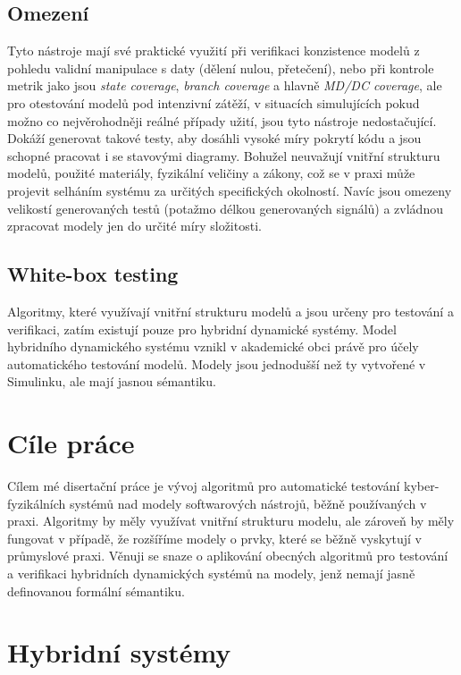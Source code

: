 \documentclass[conference,a4paper]{IEEEtran-CZ}
\begin{document}
\subsection{Omezení}

Tyto nástroje mají své praktické využití při verifikaci
konzistence modelů z pohledu validní manipulace s daty (dělení nulou, přetečení), nebo
při kontrole metrik jako jsou \emph{state coverage}, \emph{branch coverage} a 
hlavně \emph{MD/DC coverage}, ale pro otestování modelů pod intenzivní zátěží, v situacích 
simulujících pokud možno co nejvěrohodněji reálné případy užití, jsou tyto nástroje 
nedostačující. Dokáží generovat takové testy, aby dosáhli vysoké míry pokrytí kódu a
jsou schopné pracovat i se stavovými diagramy. Bohužel neuvažují vnitřní strukturu 
modelů, použité materiály, fyzikální veličiny a zákony, což se v praxi může projevit 
selháním systému za určitých specifických okolností. Navíc jsou omezeny velikostí
generovaných testů (potažmo délkou generovaných signálů) a zvládnou zpracovat
modely jen do určité míry složitosti.

\subsection{White-box testing}

Algoritmy, které využívají vnitřní strukturu modelů a jsou určeny pro testování a verifikaci,
zatím existují pouze pro hybridní dynamické systémy\cite{Dang:2009,Plaku:2013,Zutshi:2013,Ratschan:HS:2014}.
Model hybridního dynamického systému vznikl v akademické obci právě pro účely 
automatického testování modelů\cite{Schaft:HDS:2000}. Modely jsou jednodušší než 
ty vytvořené v Simulinku, ale mají jasnou sémantiku.

\section{Cíle práce}

Cílem mé disertační práce je vývoj algoritmů pro automatické testování kyber-fyzikálních systémů
nad modely softwarových nástrojů, běžně používaných v praxi. Algoritmy by měly využívat 
vnitřní strukturu modelu, ale zároveň by měly fungovat v případě, že rozšíříme modely o prvky,
které se běžně vyskytují v průmyslové praxi. Věnuji se snaze o aplikování obecných algoritmů 
pro testování a verifikaci hybridních dynamických systémů na modely, jenž nemají jasně definovanou 
formální sémantiku.

\section{Hybridní systémy}
\end{document}
